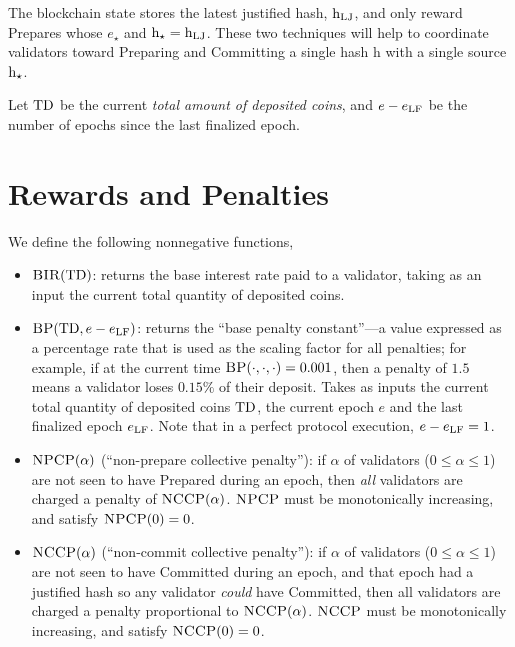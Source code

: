 \documentclass[12pt, final]{article}
\newcommand{\epoch}{\ensuremath{e}\xspace}
\newcommand{\hash}{\textnormal{h}\xspace}
\newcommand{\hashsource}{\ensuremath{\hash_{\star}}\xspace}
\newcommand{\epochsource}{\ensuremath{\epoch_{\star}}\xspace}
\newcommand{\BIR}{\textsc{BIR}\xspace}
\newcommand{\BP}{\textsc{BP}\xspace}
\newcommand{\NCCP}{\textsc{NCCP}\xspace}
\newcommand{\NPCP}{\textsc{NPCP}\xspace}
\newcommand{\totaldeposit}{\textnormal{TD}\xspace}
\newcommand{\hashLJ}{\ensuremath{\hash_{\textnormal{LJ}}}\xspace} %
\newcommand{\epochLF}{\ensuremath{\epoch_{\textnormal{LF}}}\xspace}
\begin{document}
The blockchain state stores the latest justified hash, $\hashLJ$, and only reward Prepares whose $\epochsource$ and $\hashsource = \hashLJ$. These two techniques will help to coordinate validators toward Preparing and Committing a single hash \hash with a single source \hashsource.

Let $\totaldeposit$ be the current \emph{total amount of deposited coins}, and $\epoch - \epochLF$ be the number of epochs since the last finalized epoch.


\section{Rewards and Penalties}

We define the following nonnegative functions,

\begin{itemize}
\item $\BIR(\totaldeposit)$: returns the base interest rate paid to a validator, taking as an input the current total quantity of deposited coins.

\item $\BP(\totaldeposit, \epoch - \epochLF )$: returns the ``base penalty constant''---a value expressed as a percentage rate that is used as the scaling factor for all penalties; for example, if at the current time $\BP(\cdot, \cdot, \cdot) = 0.001$, then a penalty of $1.5$ means a validator loses $0.15\%$ of their deposit. Takes as inputs the current total quantity of deposited coins $\totaldeposit$, the current epoch $e$ and the last finalized epoch \epochLF. Note that in a perfect protocol execution, $\epoch - \epochLF = 1$.

\item $\NPCP(\alpha)$ (``non-prepare collective penalty''): if $\alpha$ of validators ($0 \leq \alpha \leq 1$) are not seen to have Prepared during an epoch, then \emph{all} validators are charged a penalty of $\NCCP(\alpha)$. $\NPCP$ must be monotonically increasing, and satisfy $\NPCP(0) = 0$.

\item $\NCCP(\alpha)$ (``non-commit collective penalty''): if $\alpha$ of validators ($0 \leq \alpha \leq 1$) are not seen to have Committed during an epoch, and that epoch had a justified hash so any validator \emph{could} have Committed, then all validators are charged a penalty proportional to $\NCCP(\alpha)$. $\NCCP$ must be monotonically increasing, and satisfy $\NCCP(0) = 0$.
\end{itemize}
\end{document}
